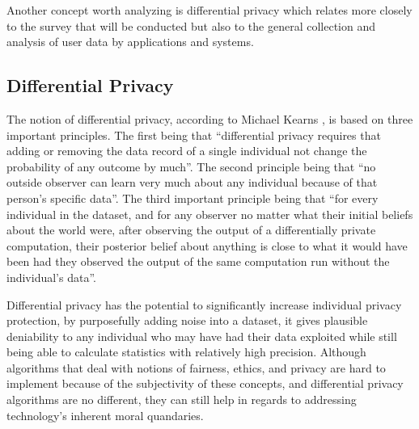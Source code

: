 Another concept worth analyzing is differential privacy which relates more
closely to the survey that will be conducted but also to the general
collection and analysis of user data by applications and systems.

\subsection{Differential Privacy}

The notion of differential privacy, according to Michael Kearns \cite{kearns2019ethical},
is based on three important principles. The first being that ``differential
privacy requires that adding or removing the data record of a single individual
not change the probability of any outcome by much''. The second principle
being that ``no outside observer can learn very much about any individual
because of that person's specific data''. The third important principle
being that ``for every individual in the dataset, and for any observer no
matter what their initial beliefs about the world were, after observing
the output of a differentially private computation, their posterior belief
about anything is close to what it would have been had they observed the
output of the same computation run without the individual's data''.

Differential privacy has the potential to significantly increase individual
privacy protection, by purposefully adding noise into a dataset, it gives
plausible deniability to any individual who may have had their data exploited
while still being able to calculate statistics with relatively high precision.
Although algorithms that deal with notions of fairness, ethics, and privacy
are hard to implement because of the subjectivity of these concepts, and
differential privacy algorithms are no different, they can still help in
regards to addressing technology's inherent moral quandaries.

